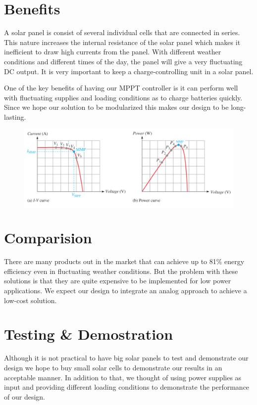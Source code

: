 \documentclass[12pt]{article}
\begin{document}
\section*{Benefits}
A solar panel is consist of several individual cells that are connected in series. This nature increases the internal resistance of the solar panel which makes it inefficient to draw high currents from the panel. With different weather conditions and different times of the day, the panel will give a very fluctuating DC output. It is very important to keep a charge-controlling unit in a solar panel.
\par
One of the key benefits of having our MPPT controller is it can perform well with fluctuating supplies and loading conditions as to charge batteries quickly. Since we hope our solution to be modularized this makes our design to be long-lasting.
\begin{figure}[h]
    \begin{center}
        \includegraphics[width=.6\textwidth]{main1.png}
    \end{center}
\end{figure}
\section*{Comparision}
There are many products out in the market that can achieve up to 81\% energy efficiency even in fluctuating weather conditions. But the problem with these solutions is that they are quite expensive to be implemented for low power applications. We expect our design to integrate an analog approach to achieve a low-cost solution.
\section*{Testing \& Demostration}
Although it is not practical to have big solar panels to test and demonstrate our design we hope to buy small solar cells to demonstrate our results in an acceptable manner. In addition to that, we thought of using power supplies as input and providing different loading conditions to demonstrate the performance of our design.
\end{document}
